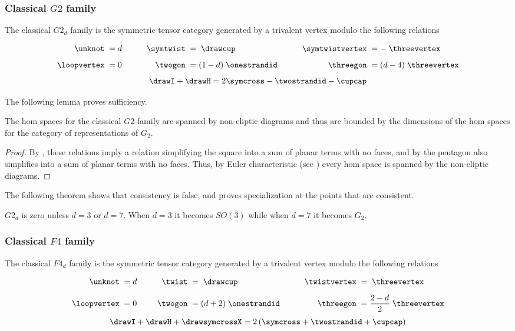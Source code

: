 \documentclass[12pt]{amsart}
\begin{document}
\subsubsection{Classical $G2$ family}
\begin{definition}
The classical $G2_d$ family is the symmetric tensor category generated by a trivalent vertex modulo the following relations

\begin{align*}
    \unknot\; &= d &\qquad
      \symtwist\; &=  \;\drawcup&\qquad
        \symtwistvertex\; &=  - \;\threevertex\\[5pt]
    \loopvertex\;&=0&
      \twogon\;&= (1-d) \;\onestrandid&
        \threegon\; &=  (d-4) \;\threevertex
\end{align*}
$$\drawI + \drawH = 2 \symcross - \twostrandid - \cupcap $$
\end{definition}

The following lemma proves sufficiency.

\begin{lemma}
The hom spaces for the classical $G2$-family are spanned by non-eliptic diagrams and thus are bounded by the dimensions of the hom spaces for the category of representations of $G_2$.
\end{lemma}
\begin{proof}
By \cite{???}, these relations imply a relation simplifying the square into a sum of planar terms with no faces, and by \cite{???} the pentagon also simplifies into a sum of planar terms with no faces.  Thus, by Euler characteristic (see \cite{???}) every hom space is spanned by the non-eliptic diagrams.
\end{proof}

The following theorem shows that consistency is false, and proves specialization at the points that are consistent.

\begin{theorem}[\cite{???}]
$G2_d$ is zero unless $d=3$ or $d=7$.  When $d=3$ it becomes $SO(3)$ while when $d=7$ it becomes $G_2$.
\end{theorem}

\subsubsection{Classical $F4$ family}

\begin{definition}
The classical $F4_d$ family is the symmetric tensor category generated by a trivalent vertex modulo the following relations

\begin{align*}
    \unknot\; &= d &\qquad
      \twist\; &=  \;\drawcup&\qquad
        \twistvertex\; &=  \;\threevertex\\[5pt]
    \loopvertex\;&=0&
      \twogon\;&= (d+2) \;\onestrandid&
        \threegon\; &=  \frac{2-d}{2} \;\threevertex
\end{align*}
$$\drawI + \drawH + \drawsymcrossX = 2 \left(\symcross + \twostrandid + \cupcap \right)$$
\end{definition}
\end{document}
